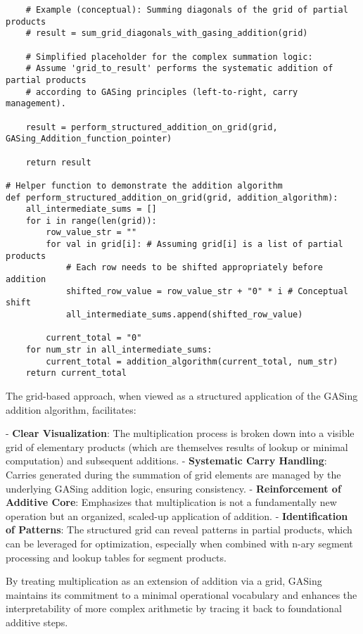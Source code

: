 \begin{verbatim}
    # Example (conceptual): Summing diagonals of the grid of partial products
    # result = sum_grid_diagonals_with_gasing_addition(grid)

    # Simplified placeholder for the complex summation logic:
    # Assume 'grid_to_result' performs the systematic addition of partial products
    # according to GASing principles (left-to-right, carry management).
    
    result = perform_structured_addition_on_grid(grid, GASing_Addition_function_pointer)

    return result

# Helper function to demonstrate the addition algorithm
def perform_structured_addition_on_grid(grid, addition_algorithm):
    all_intermediate_sums = []
    for i in range(len(grid)):
        row_value_str = ""
        for val in grid[i]: # Assuming grid[i] is a list of partial products
            # Each row needs to be shifted appropriately before addition
            shifted_row_value = row_value_str + "0" * i # Conceptual shift
            all_intermediate_sums.append(shifted_row_value)

        current_total = "0"
    for num_str in all_intermediate_sums:
        current_total = addition_algorithm(current_total, num_str)
    return current_total

\end{verbatim}


The grid-based approach, when viewed as a structured application of the GASing addition algorithm, facilitates:

-   \textbf{Clear Visualization}: The multiplication process is broken down into a visible grid of elementary products (which are themselves results of lookup or minimal computation) and subsequent additions.
-   \textbf{Systematic Carry Handling}: Carries generated during the summation of grid elements are managed by the underlying GASing addition logic, ensuring consistency.
-   \textbf{Reinforcement of Additive Core}: Emphasizes that multiplication is not a fundamentally new operation but an organized, scaled-up application of addition.
-   \textbf{Identification of Patterns}: The structured grid can reveal patterns in partial products, which can be leveraged for optimization, especially when combined with n-ary segment processing and lookup tables for segment products.

By treating multiplication as an extension of addition via a grid, GASing maintains its commitment to a minimal operational vocabulary and enhances the interpretability of more complex arithmetic by tracing it back to foundational additive steps.
